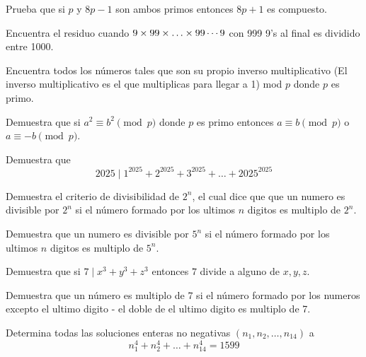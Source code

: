 \documentclass[11pt]{scrartcl}
\begin{document}
\begin{problem} 
Prueba que si $p$ y $8p-1$ son ambos primos entonces $8p+1$ es compuesto.
\end{problem}

\begin{problem} %
Encuentra el residuo cuando $9 \times 99 \time 999\times \ldots \times 99\cdots9$ con 999 9's al final es dividido entre 1000. 
\end{problem}

\begin{problem}
Encuentra todos los n\'umeros tales que son su propio inverso multiplicativo (El inverso multiplicativo es el que multiplicas para llegar a 1) mod $p$ donde $p$ es primo.
\end{problem}

\begin{problem}
Demuestra que si $a^2 \equiv b^2 \pmod p$ donde $p$ es primo entonces $a\equiv b \pmod p$ o $a\equiv -b \pmod p$.
\end{problem}

\begin{problem}
Demuestra que 
\[2025 \mid 1^{2025}+2^{2025}+3^{2025}+\ldots + 2025^{2025}\]
\end{problem}

\begin{problem}
Demuestra el criterio de divisibilidad de $2^n$, el cual dice que que un numero es divisible por $2^n$ si el número formado por los ultimos $n$ digitos es multiplo de $2^n$.
\end{problem}

\begin{problem}
Demuestra que un numero es divisible por $5^n$ si el número formado por los ultimos $n$ digitos es multiplo de $5^n$.
\end{problem}


\begin{problem}
Demuestra que si $7 \mid x^3+y^3+z^3$ entonces $7 $ divide a alguno de $x,y,z$.
\end{problem}

\begin{problem}
Demuestra que un número es multiplo de 7 si el número formado por los numeros excepto el ultimo digito - el doble de el ultimo digito es multiplo de 7.
\end{problem}

\begin{problem}
Determina todas las soluciones enteras no negativas $(n_1,n_2, \ldots, n_14)$ a
\[n_1^4+n_2^4+\ldots+n_{14}^4 =1599\]
\end{problem}
\end{document}
